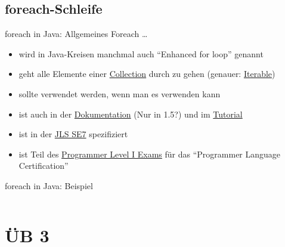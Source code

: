 \documentclass[usepdftitle=false,hyperref={pdfpagelabels=false}]{beamer}
\begin{document}
\subsection{foreach-Schleife}
\begin{frame}{foreach in Java: Allgemeines}
    Foreach \dots
    \begin{itemize}[<+->]
        \item wird in Java-Kreisen manchmal auch "`Enhanced for loop"' genannt
        \item geht alle Elemente einer
              \href{http://docs.oracle.com/javase/7/docs/api/java/util/Collection.html}{Collection}
              durch zu gehen (genauer: \href{http://docs.oracle.com/javase/7/docs/api/java/lang/Iterable.html}{Iterable})
        \item sollte verwendet werden, wenn man es verwenden kann
        \item ist auch in der \href{http://docs.oracle.com/javase/1.5.0/docs/guide/language/foreach.html}{Dokumentation} (Nur in 1.5?)
              und im \href{http://docs.oracle.com/javase/tutorial/java/nutsandbolts/for.html}{Tutorial}
        \item ist in der \href{http://docs.oracle.com/javase/specs/jls/se7/html/jls-14.html\#jls-14.14.2}{JLS SE7} spezifiziert
        \item ist Teil des \href{http://docs.oracle.com/javase/tutorial/extra/certification/javase-7-programmer1.html}{Programmer Level I Exams}
              für das "`Programmer Language Certification"'
    \end{itemize}
\end{frame}
\begin{frame}{foreach in Java: Beispiel}
    \inputminted[linenos=false, numbersep=5pt, tabsize=4, fontsize=\small, firstline=3, lastline=13]{java}{foreach.java}
\end{frame}

\section{ÜB 3}
\end{document}
